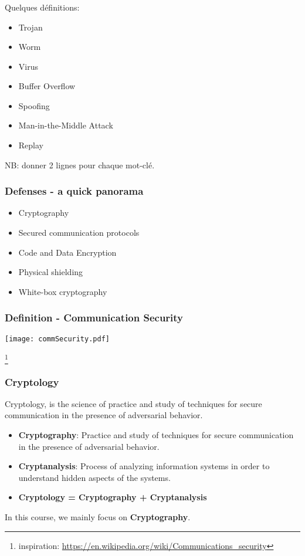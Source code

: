 \documentclass[
hyperref={pdfpagelabels=false}
,xcolor=table
]
{beamer}
\begin{document}
\begin{frame}
  \frametitle{}
  Quelques définitions:
  \begin{itemize}
  \item Trojan
  \item Worm
  \item Virus
  \item Buffer Overflow
  \item Spoofing
  \item Man-in-the-Middle Attack
  \item Replay
  \end{itemize}


  NB: donner 2 lignes pour chaque mot-clé. 
  
\end{frame}

\begin{frame}
  \frametitle{Defenses - a quick panorama}
  \begin{itemize}
  \item Cryptography
  \item Secured communication protocols
  \item Code and Data Encryption
  \item Physical shielding
  \item White-box cryptography    
  \end{itemize}
\end{frame}


\begin{frame}[fragile]
  \frametitle{Definition - Communication Security}

  \begin{block}{}
    \begin{center}
      \texttt{[image: commSecurity.pdf]}
    \end{center}
    \footnote{inspiration: \url{https://en.wikipedia.org/wiki/Communications_security}}
  \end{block}
\end{frame}


\begin{frame}
  \frametitle{Cryptology}

  Cryptology, is the science of practice and study of techniques for secure communication in the presence of adversarial behavior.

  \begin{itemize}
  \item \textbf{Cryptography}: Practice and study of techniques for secure communication in the presence of adversarial behavior.
  \item \textbf{Cryptanalysis}: Process of analyzing information systems in order to understand hidden aspects of the systems. 
  \item \textbf{Cryptology = Cryptography + Cryptanalysis}
  \end{itemize}

  In this course, we mainly focus on \textbf{Cryptography}. 
\end{frame}
\end{document}
